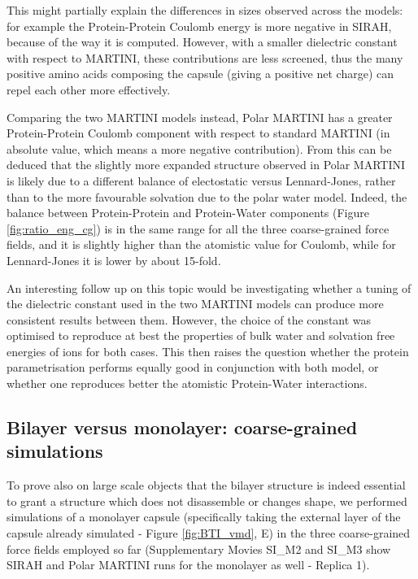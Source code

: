This might partially explain the differences in sizes observed across the models: for example the Protein-Protein Coulomb energy is more negative in SIRAH, because of the way it is computed. However, with a smaller dielectric constant with respect to MARTINI, these contributions are less screened, thus the many positive amino acids composing the capsule (giving a positive net charge) can repel each other more effectively.

Comparing the two MARTINI models instead, Polar MARTINI has a greater Protein-Protein Coulomb component with respect to standard MARTINI (in absolute value, which means a more negative contribution). From this can be deduced that the slightly more expanded structure observed in Polar MARTINI is likely due to a different balance of electostatic versus Lennard-Jones, rather than to the more favourable solvation due to the polar water model.
%
Indeed, the balance between Protein-Protein and Protein-Water components (Figure \ref{fig:ratio_eng_cg}) is in the same range for all the three coarse-grained force fields, and it is slightly higher than the atomistic value for Coulomb, while for Lennard-Jones it is lower by about 15-fold.

An interesting follow up on this topic would be investigating whether a tuning of the dielectric constant used in the two MARTINI models can produce more consistent results between them. However, the choice of the constant was optimised to reproduce at best the properties of bulk water and solvation free energies of ions for both cases. This then raises the question whether the protein parametrisation performs equally good in conjunction with both model, or whether one reproduces better the atomistic Protein-Water interactions.


\subsection{Bilayer versus monolayer: coarse-grained simulations} \label{sec:mono}
To prove also on large scale objects that the bilayer structure is indeed essential to grant a structure which does not disassemble or changes shape, we performed simulations of a monolayer capsule (specifically taking the external layer of the capsule already simulated - Figure \ref{fig:BTI_vmd}, E) in the three coarse-grained force fields employed so far (Supplementary Movies SI\_M2 and SI\_M3 show SIRAH and Polar MARTINI runs for the monolayer as well - Replica 1).

